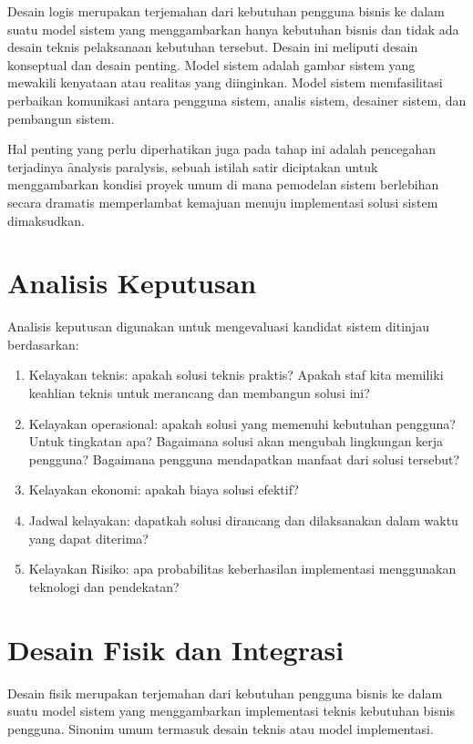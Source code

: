 Desain logis merupakan terjemahan dari kebutuhan pengguna bisnis ke dalam suatu model sistem yang menggambarkan hanya kebutuhan bisnis dan tidak ada desain teknis pelaksanaan kebutuhan tersebut. Desain ini meliputi desain konseptual dan desain penting. Model sistem adalah gambar sistem yang mewakili kenyataan atau realitas yang diinginkan. Model sistem memfasilitasi perbaikan komunikasi antara pengguna sistem, analis sistem, desainer sistem, dan pembangun sistem. 

Hal penting yang perlu diperhatikan juga pada tahap ini adalah pencegahan terjadinya \f{analysis paralysis}, sebuah istilah satir diciptakan untuk menggambarkan kondisi proyek umum di mana pemodelan sistem berlebihan secara dramatis memperlambat kemajuan menuju implementasi solusi sistem dimaksudkan.

\section{Analisis Keputusan}

Analisis keputusan digunakan untuk mengevaluasi kandidat sistem ditinjau berdasarkan:

\begin{enumerate}[itemsep=-1ex]
\item Kelayakan teknis: apakah solusi teknis praktis? Apakah staf kita memiliki keahlian teknis untuk merancang dan membangun solusi ini? 
\item Kelayakan operasional: apakah solusi yang memenuhi kebutuhan pengguna? Untuk tingkatan apa? Bagaimana solusi akan mengubah lingkungan kerja pengguna? Bagaimana pengguna mendapatkan manfaat dari solusi tersebut? 
\item Kelayakan ekonomi: apakah biaya solusi efektif? 
\item Jadwal kelayakan: dapatkah solusi dirancang dan dilaksanakan dalam waktu yang dapat diterima? 
\item Kelayakan Risiko: apa probabilitas keberhasilan implementasi menggunakan teknologi dan pendekatan?
\end{enumerate}

\section{Desain Fisik dan Integrasi}

Desain fisik merupakan terjemahan dari kebutuhan pengguna bisnis ke dalam suatu model sistem yang menggambarkan implementasi teknis kebutuhan bisnis pengguna. Sinonim umum termasuk desain teknis atau model implementasi. 

